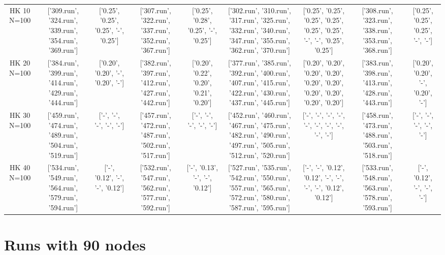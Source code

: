 \documentclass[landscape, 12pt]{report}
\begin{document}
\begin{tabular}{|c|cc|cc|cc|cc|}
HK 10 N=100 & ['309.run', '324.run', '339.run', '354.run', '369.run'] & ['0.25', '0.25', '0.25', '-', '0.25'] & ['307.run', '322.run', '337.run', '352.run', '367.run'] & ['0.25', '0.28', '0.25', '-', '0.25'] & ['302.run', '310.run', '317.run', '325.run', '332.run', '340.run', '347.run', '355.run', '362.run', '370.run'] & ['0.25', '0.25', '0.25', '0.25', '0.25', '0.25', '-', '-', '0.25', '0.25'] & ['308.run', '323.run', '338.run', '353.run', '368.run'] & ['0.25', '0.25', '0.25', '-', '-']
\\
HK 20 N=100 & ['384.run', '399.run', '414.run', '429.run', '444.run'] & ['0.20', '0.20', '-', '0.20', '-'] & ['382.run', '397.run', '412.run', '427.run', '442.run'] & ['0.20', '0.22', '0.20', '0.21', '0.20'] & ['377.run', '385.run', '392.run', '400.run', '407.run', '415.run', '422.run', '430.run', '437.run', '445.run'] & ['0.20', '0.20', '0.20', '0.20', '0.20', '0.20', '0.20', '0.20', '0.20', '0.20'] & ['383.run', '398.run', '413.run', '428.run', '443.run'] & ['0.20', '0.20', '-', '0.20', '-']
\\
HK 30 N=100 & ['459.run', '474.run', '489.run', '504.run', '519.run'] & ['-', '-', '-', '-', '-'] & ['457.run', '472.run', '487.run', '502.run', '517.run'] & ['-', '-', '-', '-', '-'] & ['452.run', '460.run', '467.run', '475.run', '482.run', '490.run', '497.run', '505.run', '512.run', '520.run'] & ['-', '-', '-', '-', '-', '-', '-', '-', '-', '-'] & ['458.run', '473.run', '488.run', '503.run', '518.run'] & ['-', '-', '-', '-', '-']
\\
HK 40 N=100 & ['534.run', '549.run', '564.run', '579.run', '594.run'] & ['-', '0.12', '-', '-', '0.12'] & ['532.run', '547.run', '562.run', '577.run', '592.run'] & ['-', '0.13', '-', '-', '0.12'] & ['527.run', '535.run', '542.run', '550.run', '557.run', '565.run', '572.run', '580.run', '587.run', '595.run'] & ['-', '-', '0.12', '0.12', '-', '-', '-', '-', '0.12', '0.12'] & ['533.run', '548.run', '563.run', '578.run', '593.run'] & ['-', '0.12', '-', '-', '-']
\\
\hline 
 \end{tabular}


\clearpage
	
	\section{Runs with 90 nodes}
	
\end{document}
